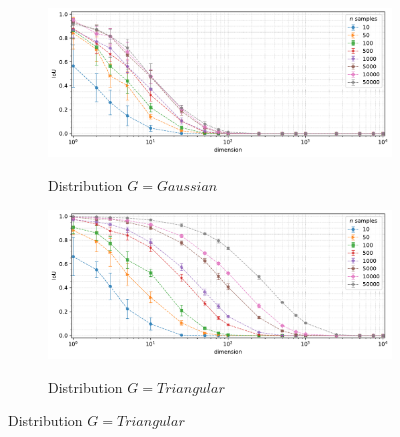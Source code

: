\begin{figure}[t]
    \centering
    \vspace{-0.75em}
    \begin{subfigure}[b]{0.9\textwidth}
        \centering
        \caption{\small Distribution $G = Gaussian$}
        \includegraphics[width=\textwidth]{images/overlapping/trend-overlapping-IoU(dimension)-distribution_gaussian-samples_10,50,100,500,1000,5000,10000,50000-aggregated.pdf}
        \label{fig:iou-gaussian}
    \end{subfigure}

    \vspace{-0.75em}
    \begin{subfigure}[b]{0.9\textwidth}
        \centering
        \caption{\small Distribution $G = Triangular$}
        \includegraphics[width=\textwidth]{images/overlapping/trend-overlapping-IoU(dimension)-distribution_triangular-samples_10,50,100,500,1000,5000,10000,50000-aggregated.pdf}
        \label{fig:iou-triangular}
    \end{subfigure}


\end{figure}
